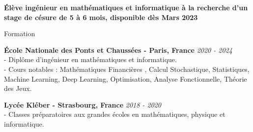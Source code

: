 \documentclass{resume} %
\begin{document}
\begin{center}
    \textbf{\Large{\'Elève ingénieur en mathématiques et informatique à la recherche d'un stage de césure de 5 à 6 mois, disponible dès Mars 2023}}
\end{center}





\begin{rSection}{Formation}

{\bf \'Ecole Nationale des Ponts et Chaussées - Paris, France} \hfill {\em 2020 - 2024} 
\\- Diplôme d'ingénieur en mathématiques et informatique. \hfill 
\\- Cours notables : Mathématiques Financières , Calcul Stochastique, Statistiques, Machine Learning, Deep Learning, Optimisation, Analyse Fonctionnelle, Théorie des Jeux.

{\bf Lycée Kléber - Strasbourg, France} \hfill {\em 2018 - 2020} 
\\- Classes préparatoires aux grandes écoles en mathématiques, physique et informatique. \hfill 

\end{rSection}
\end{document}
